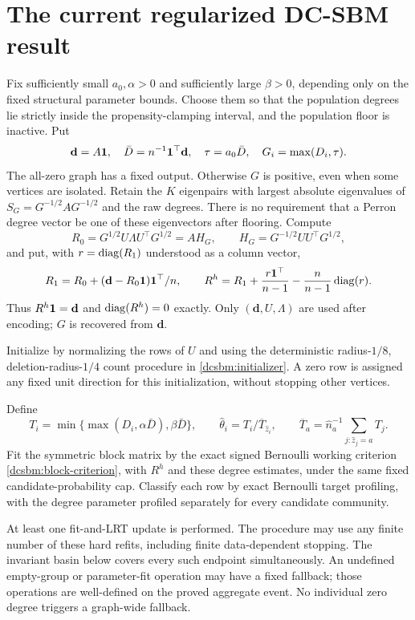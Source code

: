 \section{The current regularized DC-SBM result}\label{sec:sparse-restored}
\label{restore:algorithm}

Fix sufficiently small $a_0,\alpha>0$ and sufficiently large $\beta>0$,
depending only on the fixed structural parameter bounds. Choose them so
that the population degrees lie strictly inside the propensity-clamping
interval, and the population floor is inactive. Put
\[
 \mathbf d=A\mathbf 1,\quad \bar D=n^{-1}\mathbf 1^\top\mathbf d,\quad
 \tau=a_0\bar D,\quad G_i=\max(D_i,\tau).
\]
The all-zero graph has a fixed output. Otherwise $G$ is positive, even
when some vertices are isolated. Retain the $K$ eigenpairs with largest
absolute eigenvalues of $S_G=G^{-1/2}AG^{-1/2}$ and the raw degrees.
There is no requirement that a Perron degree vector be one of these
eigenvectors after flooring. Compute
\[
 R_0=G^{1/2}U\Lambda U^\top G^{1/2}=AH_G,
 \qquad H_G=G^{-1/2}UU^\top G^{1/2},
\]
and put, with $r=\operatorname{diag}(R_1)$ understood as a column vector,
\begin{equation}\label{restore:reconstruction}
 R_1=R_0+(\mathbf d-R_0\mathbf 1)\mathbf 1^\top/n,\qquad
 R^h=R_1+\frac{r\mathbf 1^\top}{n-1}-\frac n{n-1}\operatorname{diag}(r).
\end{equation}
Thus $R^h\mathbf 1=\mathbf d$ and $\operatorname{diag}(R^h)=0$ exactly. Only $(\mathbf d,U,\Lambda)$ are used
after encoding; $G$ is recovered from $\mathbf d$.

Initialize by normalizing the rows of $U$ and using the deterministic
radius-$1/8$, deletion-radius-$1/4$ count procedure in
\cref{dcsbm:initializer}. A zero row is assigned any fixed unit direction
for this initialization, without stopping other vertices.

Define
\[
 T_i=\min\{\max(D_i,\alpha\bar D),\beta\bar D\},\qquad
 \widehat\theta_i=T_i/\overline T_{\widehat z_i},\qquad
 \overline T_a=\widehat n_a^{-1}\sum_{j:\widehat z_j=a}T_j.
\]
Fit the symmetric block matrix by the exact signed Bernoulli working
criterion \eqref{dcsbm:block-criterion}, with $R^h$ and these degree
estimates, under the same fixed candidate-probability cap. Classify each
row by exact Bernoulli target profiling, with the degree parameter
profiled separately for every candidate community.

At least one fit-and-LRT update is performed. The procedure may use any
finite number of these hard refits, including finite data-dependent
stopping. The invariant basin below covers every such endpoint
simultaneously. An undefined empty-group or parameter-fit operation may
have a fixed fallback; those operations are well-defined on the proved
aggregate event. No individual zero degree triggers a graph-wide fallback.

